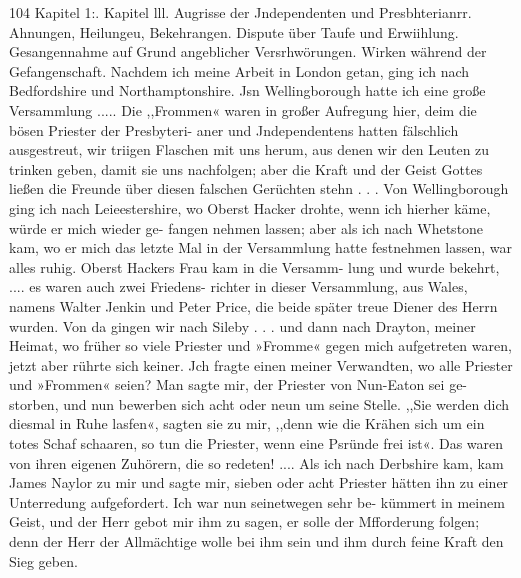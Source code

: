 104 Kapitel 1:.
Kapitel lll.
Augrisse der Jndependenten und Presbhterianrr. Ahnungen,
Heilungeu, Bekehrangen. Dispute über Taufe und Erwiihlung.
Gesangennahme auf Grund angeblicher Versrhwörungen. Wirken
während der Gefangenschaft.
Nachdem ich meine Arbeit in London getan, ging ich nach
Bedfordshire und Northamptonshire. Jsn Wellingborough hatte
ich eine große Versammlung ..... Die ,,Frommen« waren in
großer Aufregung hier, deim die bösen Priester der Presbyteri-
aner und Jndependentens hatten fälschlich ausgestreut, wir triigen
Flaschen mit uns herum, aus denen wir den Leuten zu trinken
geben, damit sie uns nachfolgen; aber die Kraft und der Geist
Gottes ließen die Freunde über diesen falschen Gerüchten stehn . . .
Von Wellingborough ging ich nach Leieestershire, wo Oberst
Hacker drohte, wenn ich hierher käme, würde er mich wieder ge-
fangen nehmen lassen; aber als ich nach Whetstone kam, wo er
mich das letzte Mal in der Versammlung hatte festnehmen lassen,
war alles ruhig. Oberst Hackers Frau kam in die Versamm-
lung und wurde bekehrt, .... es waren auch zwei Friedens-
richter in dieser Versammlung, aus Wales, namens Walter
Jenkin und Peter Price, die beide später treue Diener des
Herrn wurden.
Von da gingen wir nach Sileby . . . und dann nach Drayton,
meiner Heimat, wo früher so viele Priester und »Fromme« gegen
mich aufgetreten waren, jetzt aber rührte sich keiner. Jch fragte
einen meiner Verwandten, wo alle Priester und »Frommen«
seien? Man sagte mir, der Priester von Nun-Eaton sei ge-
storben, und nun bewerben sich acht oder neun um seine Stelle.
,,Sie werden dich diesmal in Ruhe lasfen«, sagten sie zu mir,
,,denn wie die Krähen sich um ein totes Schaf schaaren, so tun die
Priester, wenn eine Psründe frei ist«. Das waren von ihren
eigenen Zuhörern, die so redeten! ....
Als ich nach Derbshire kam, kam James Naylor zu mir
und sagte mir, sieben oder acht Priester hätten ihn zu einer
Unterredung aufgefordert. Ich war nun seinetwegen sehr be-
kümmert in meinem Geist, und der Herr gebot mir ihm zu sagen,
er solle der Mfforderung folgen; denn der Herr der Allmächtige
wolle bei ihm sein und ihm durch feine Kraft den Sieg geben.


